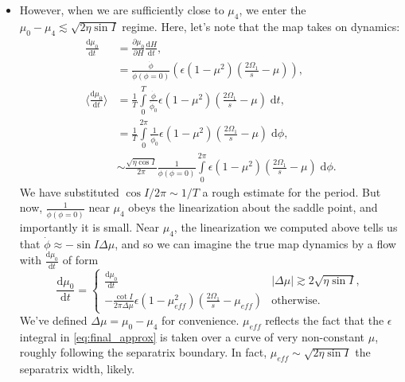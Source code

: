 \documentclass[11pt,
        usenames, %
        dvipsnames %
    ]{article}
\newcommand*{\rd}[2]{\frac{\mathrm{d}#1}{\mathrm{d}#2}}
\newcommand*{\pd}[2]{\frac{\partial#1}{\partial#2}}
\newcommand*{\abs}[1]{\left|#1\right|}
\newcommand*{\ev}[1]{\langle#1\rangle}
\newcommand*{\p}[1]{\left(#1\right)}
\begin{document}
\begin{itemize}
    \item However, when we are sufficiently close to $\mu_4$, we enter the
        $\mu_0 - \mu_4 \lesssim \sqrt{2\eta \sin I}$ regime. Here, let's note
        that the map takes on dynamics:
        \begin{align}
            \rd{\mu_0}{t} &= \pd{\mu_0}{H}\rd{H}{t},\nonumber\\
                &= \frac{\dot{\phi}}{\dot{\phi}(\phi = 0)}
                    \p{\epsilon\p{1 - \mu^2}\p{\frac{2\Omega_1}{s}
                        - \mu}},\nonumber\\
            \ev{\rd{\mu_0}{t}} &=
                \frac{1}{T}\int\limits_0^T
                    \frac{\dot{\phi}}{\dot{\phi}_0}
                        \epsilon\p{1 - \mu^2}\p{\frac{2\Omega_1}{s} - \mu}
                            \;\mathrm{d}t,\nonumber\\
                &= \frac{1}{T}\int\limits_0^{2\pi}
                    \frac{1}{\dot{\phi}_0}
                        \epsilon\p{1 - \mu^2}\p{\frac{2\Omega_1}{s} - \mu}
                            \;\mathrm{d}\phi,\nonumber\\
                &\sim \frac{\sqrt{\eta \cos I}}{2\pi}
                    \frac{1}{\dot{\phi}(\phi = 0)}
                    \int\limits_0^{2\pi}
                        \epsilon\p{1 - \mu^2}\p{\frac{2\Omega_1}{s} - \mu}
                        \;\mathrm{d}\phi.\label{eq:final_approx}
        \end{align}
        We have substituted $\cos I/2\pi \sim 1/T$ a rough estimate
        for the period. But now, $\frac{1}{\dot{\phi}(\phi = 0)}$ near $\mu_4$
        obeys the linearization about the saddle point, and importantly it is
        small. Near $\mu_4$, the linearization we computed above tells us that
        $\dot{\phi} \approx - \sin I \Delta \mu$, and so we can imagine the
        true map dynamics by a flow with $\rd{\mu_0}{t}$ of form
        \begin{equation}
            \rd{\mu_0}{t} =
                \begin{cases}
                    \rd{\mu_0}{t} & \abs{\Delta \mu} \gtrsim
                        2\sqrt{\eta \sin I},\\
                    -\frac{\cot I}{2\pi \Delta \mu}
                        \epsilon\p{1 - \mu_{eff}^2}
                            \p{\frac{2\Omega_1}{s} - \mu_{eff}}
                            & \text{otherwise}.
                \end{cases}
        \end{equation}
        We've defined $\Delta \mu = \mu_0 - \mu_4$ for convenience. $\mu_{eff}$
        reflects the fact that the $\epsilon$ integral in
        \autoref{eq:final_approx} is taken over a curve of very non-constant
        $\mu$, roughly following the separatrix boundary. In fact, $\mu_{eff}
        \sim \sqrt{2\eta \sin I}$ the separatrix width, likely.


\end{itemize}
\end{document}
